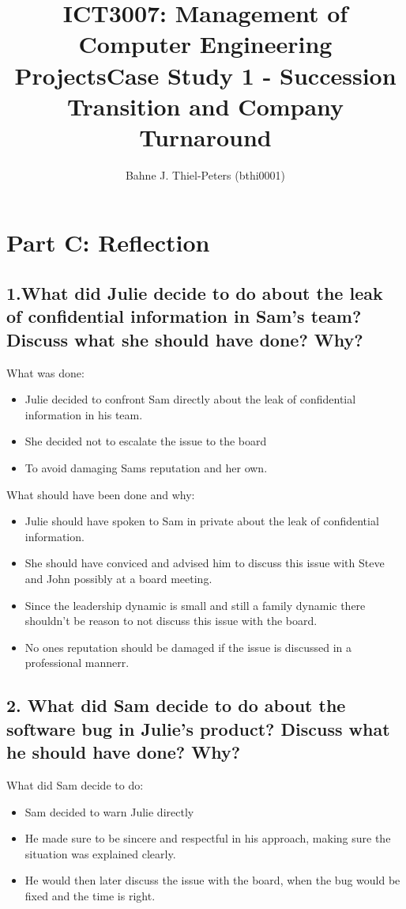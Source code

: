 \documentclass[a4paper,10pt]{article}
\title{ICT3007: Management of Computer Engineering Projects\newline \centering Case Study 1 - Succession Transition and Company Turnaround}
\author{
Bahne J. Thiel-Peters (bthi0001)
}
\begin{document}
\maketitle
\thispagestyle{empty}

\setcounter{page}{1}

\section{Part C: Reflection}
\subsection{1.What did Julie decide to do about the leak of confidential information in Sam’s team? Discuss what she should have done? Why?}

What was done:
\begin{itemize}
    \item Julie decided to confront Sam directly about the leak of confidential information in his team.
    \item She decided not to escalate the issue to the board
    \item To avoid damaging Sams reputation and her own.
\end{itemize}

What should have been done and why:
\begin{itemize}
    \item Julie should have spoken to Sam in private about the leak of confidential information.
    \item She should have conviced and advised him to discuss this issue with Steve and John possibly at a board meeting.
    \item Since the leadership dynamic is small and still a family dynamic there shouldn't be reason to not discuss this issue with the board. 
    \item No ones reputation should be damaged if the issue is discussed in a professional mannerr.
\end{itemize}

\subsection{2. What did Sam decide to do about the software bug in Julie’s product? Discuss what he should have done? Why?}

What did Sam decide to do:
\begin{itemize}
    \item Sam decided to warn Julie directly
    \item He made sure to be sincere and respectful in his approach, making sure the situation was explained clearly.
    \item He would then later discuss the issue with the board, when the bug would be fixed and the time is right.
\end{itemize}
\end{document}
